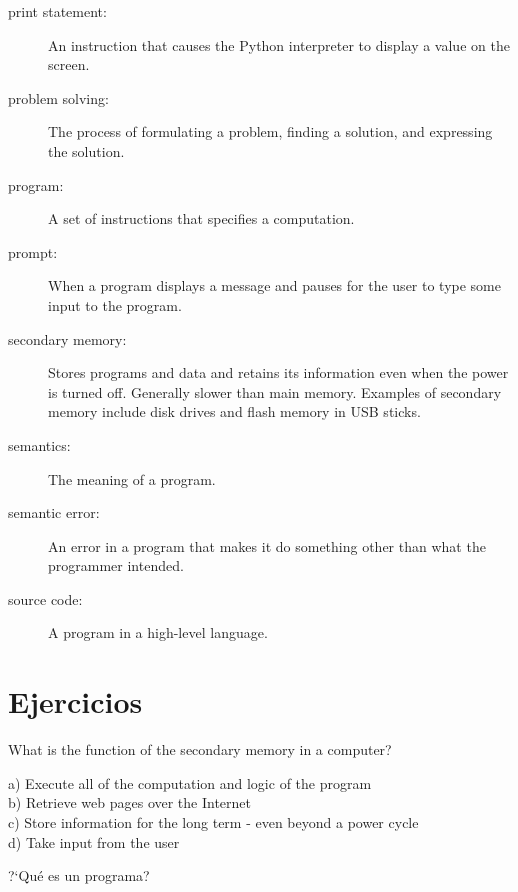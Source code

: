 \begin{description}
\item[print statement:]  An instruction that causes the Python
interpreter to display a value on the screen.

\item[problem solving:]  The process of formulating a problem, finding
a solution, and expressing the solution.

\item[program:] A set of instructions that specifies a computation.

\item[prompt:] When a program displays a message and pauses for the 
user to type some input to the program.

\item[secondary memory:] Stores programs and data and retains its 
information even when the power is turned off.  Generally slower 
than main memory.  Examples of secondary memory include disk 
drives and flash memory in USB sticks.

\item[semantics:]  The meaning of a program.

\item[semantic error:]   An error in a program that makes it do something
other than what the programmer intended.

\item[source code:]  A program in a high-level language.

\end{description}

\section{Ejercicios}


\begin{ex}
What is the function of the secondary memory in a computer?

a) Execute all of the computation and logic of the program\\
b) Retrieve web pages over the Internet\\
c) Store information for the long term - even beyond a power cycle\\
d) Take input from the user 
\end{ex}

\begin{ex}
?`Qu\'e es un programa?
\end{ex}

